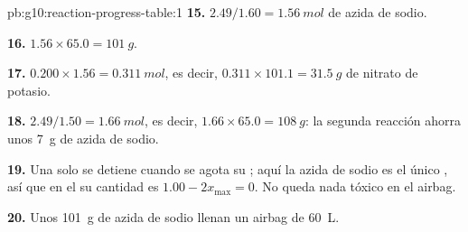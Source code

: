 \begin{solution}{pb:g10:reaction-progress-table:1}
\textbf{15.} $2.49 / 1.60 = \qty{1.56}{mol}$ de azida de sodio.

\textbf{16.} $1.56 \times 65.0 = \qty{101}{g}$.

\textbf{17.} $0.200 \times 1.56 = \qty{0.311}{mol}$, es decir,
$0.311 \times 101.1 = \qty{31.5}{g}$ de nitrato de potasio.

\textbf{18.} $2.49 / 1.50 = \qty{1.66}{mol}$, es decir,
$1.66 \times 65.0 = \qty{108}{g}$: la segunda reacción ahorra unos
\qty{7}{g} de azida de sodio.

\textbf{19.} Una  solo se detiene cuando se agota su
; aquí la azida de sodio es el único , así que
en el  su cantidad es $1.00 - 2x_{\max} = 0$. No queda nada
tóxico en el airbag.

\textbf{20.} Unos \qty{101}{g} de azida de sodio llenan un airbag de
\qty{60}{L}.
\end{solution}
